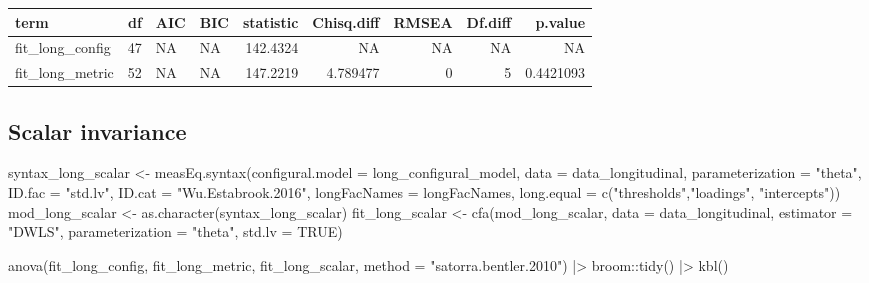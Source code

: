 \documentclass[
  letterpaper,
  DIV=11,
  numbers=noendperiod]{scrreprt}
\newenvironment{Shaded}{\begin{snugshade}}{\end{snugshade}}
\newcommand{\AttributeTok}[1]{\textcolor[rgb]{0.40,0.45,0.13}{#1}}
\newcommand{\ConstantTok}[1]{\textcolor[rgb]{0.56,0.35,0.01}{#1}}
\newcommand{\FunctionTok}[1]{\textcolor[rgb]{0.28,0.35,0.67}{#1}}
\newcommand{\NormalTok}[1]{\textcolor[rgb]{0.00,0.23,0.31}{#1}}
\newcommand{\OtherTok}[1]{\textcolor[rgb]{0.00,0.23,0.31}{#1}}
\newcommand{\SpecialCharTok}[1]{\textcolor[rgb]{0.37,0.37,0.37}{#1}}
\newcommand{\StringTok}[1]{\textcolor[rgb]{0.13,0.47,0.30}{#1}}
\begin{document}
\begin{tabular}[t]{l|r|l|l|r|r|r|r|r}
\hline
term & df & AIC & BIC & statistic & Chisq.diff & RMSEA & Df.diff & p.value\\
\hline
fit\_long\_config & 47 & NA & NA & 142.4324 & NA & NA & NA & NA\\
\hline
fit\_long\_metric & 52 & NA & NA & 147.2219 & 4.789477 & 0 & 5 & 0.4421093\\
\hline
\end{tabular}

\hypertarget{scalar-invariance}{%
\subsection{Scalar invariance}\label{scalar-invariance}}

\begin{Shaded}
\begin{Highlighting}[]
\NormalTok{syntax\_long\_scalar }\OtherTok{\textless{}{-}} \FunctionTok{measEq.syntax}\NormalTok{(}\AttributeTok{configural.model =}\NormalTok{ long\_configural\_model,}
                               \AttributeTok{data =}\NormalTok{ data\_longitudinal,}
                               \AttributeTok{parameterization =} \StringTok{"theta"}\NormalTok{,}
                               \AttributeTok{ID.fac =} \StringTok{"std.lv"}\NormalTok{, }\AttributeTok{ID.cat =} \StringTok{"Wu.Estabrook.2016"}\NormalTok{,}
                               \AttributeTok{longFacNames =}\NormalTok{ longFacNames,}
                               \AttributeTok{long.equal  =} \FunctionTok{c}\NormalTok{(}\StringTok{"thresholds"}\NormalTok{,}\StringTok{"loadings"}\NormalTok{,}
                                               \StringTok{"intercepts"}\NormalTok{))}
\NormalTok{mod\_long\_scalar }\OtherTok{\textless{}{-}} \FunctionTok{as.character}\NormalTok{(syntax\_long\_scalar)}
\NormalTok{fit\_long\_scalar }\OtherTok{\textless{}{-}} \FunctionTok{cfa}\NormalTok{(mod\_long\_scalar, }\AttributeTok{data =}\NormalTok{ data\_longitudinal, }\AttributeTok{estimator =} \StringTok{"DWLS"}\NormalTok{,}
                  \AttributeTok{parameterization =} \StringTok{"theta"}\NormalTok{, }\AttributeTok{std.lv =} \ConstantTok{TRUE}\NormalTok{)}

\FunctionTok{anova}\NormalTok{(fit\_long\_config, fit\_long\_metric, fit\_long\_scalar, }\AttributeTok{method =} \StringTok{"satorra.bentler.2010"}\NormalTok{) }\SpecialCharTok{|\textgreater{}} 
\NormalTok{  broom}\SpecialCharTok{::}\FunctionTok{tidy}\NormalTok{() }\SpecialCharTok{|\textgreater{}} 
  \FunctionTok{kbl}\NormalTok{()}
\end{Highlighting}
\end{Shaded}
\end{document}
